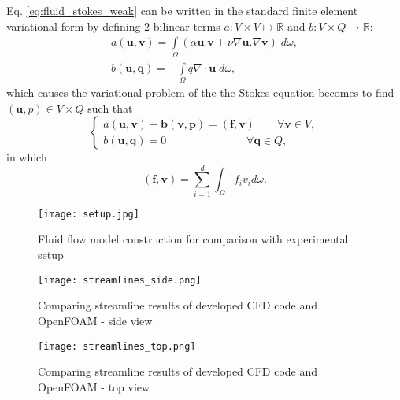 Eq. \ref{eq:fluid_stokes_weak} can be written in the standard finite element variational form by defining 2 bilinear terms $a: V \times V \mapsto \mathbb{R}$ and $b: V \times Q \mapsto \mathbb{R}$:
\begin{equation}
\begin{array}{*{20}{l}}
\displaystyle  {a({\mathbf{u}},{\mathbf{v}}) = \int\limits_\Omega  {(\alpha {\mathbf{u}}.{\mathbf{v}} + \nu\nabla {\mathbf{u}}.\nabla {\mathbf{v}})\;d\omega ,} } \\ 
\displaystyle  {b({\mathbf{u}},{\mathbf{q}}) =  - \int\limits_\Omega  {q\nabla\cdot{\mathbf{u}}\;d\omega ,} } 
\end{array}
\end{equation}
which causes the variational problem of the the Stokes equation becomes to find $(\mathbf{u}, p) \in V \times Q$ such that
\begin{equation}
\left\{ {\begin{array}{*{20}{l}}
\displaystyle  {a({\mathbf{u}},{\mathbf{v}}) + {\mathbf{b}}({\mathbf{v}},{\mathbf{p}}) = ({\mathbf{f}},{\mathbf{v}})\qquad {\forall {\mathbf{v}}} \in V,} \\ 
\displaystyle  {b({\mathbf{u}},{\mathbf{q}}) = 0\qquad \qquad \qquad \quad \;{\forall {\mathbf{q}}} \in Q,} 
\end{array}} \right.
\end{equation}
in which
\begin{equation}
(\mathbf{f}, \mathbf{v})=\sum_{i=1}^{d} \int_{\Omega} f_{i} v_{i} d \omega.
\end{equation}



\begin{figure}[h]
\centering
\medskip
\texttt{[image: setup.jpg]}
\caption[Fluid flow model construction for comparison with experimental setup]{Fluid flow model construction for comparison with experimental setup} \label{fig:fluid_setup}
\end{figure}

\begin{figure}[h]
\centering
\medskip
\texttt{[image: streamlines\_side.png]}
\caption[Comparing streamline results of developed CFD code and OpenFOAM - side view]{Comparing streamline results of developed CFD code and OpenFOAM - side view} \label{fig:fluid_streamlines_side}
\end{figure}


\begin{figure}[h]
\centering
\medskip
\texttt{[image: streamlines\_top.png]}
\caption[Comparing streamline results of developed CFD code and OpenFOAM - top view]{Comparing streamline results of developed CFD code and OpenFOAM - top view} \label{fig:fluid_streamlines_top}
\end{figure}


